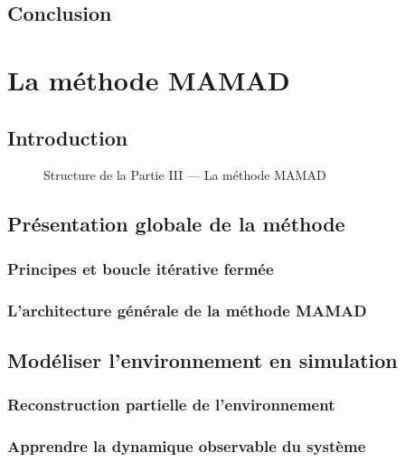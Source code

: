 \documentclass[ twoside,openright,titlepage,numbers=noenddot,headinclude,%
                footinclude=true,cleardoublepage=empty,abstractoff, %
                BCOR=5mm,paper=a4,fontsize=11pt,%
                french,american,%
                ]{scrreprt}
\begin{document}
\chapter*{Conclusion}

\cleardoublepage
{}
{}
\part{La méthode MAMAD}

\chapter*{Introduction}

\begin{figure}[h!]
    \centering
    \resizebox{0.5\linewidth}{!}{%
        
    }
    \caption{Structure de la Partie III — La méthode MAMAD}
\end{figure}

\chapter{Présentation globale de la méthode}

\section{Principes et boucle itérative fermée}

\section{L'architecture générale de la méthode MAMAD}

\chapter{Modéliser l'environnement en simulation}
\section{Reconstruction partielle de l’environnement}
\section{Apprendre la dynamique observable du système}
\end{document}
